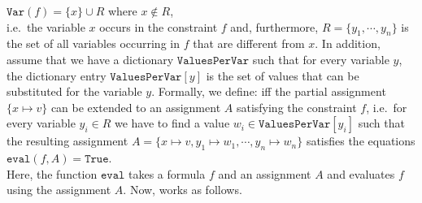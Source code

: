 $\texttt{Var}(f) = \{ x \} \cup R$ \quad where $x \not\in R$,
\\[0.2cm]
i.e.~the variable $x$ occurs in the constraint $f$ and, furthermore, $R = \{y_1, \cdots, y_n\}$ is the set of
all variables occurring 
in $f$ that are different from $x$.  In addition, assume that we have a dictionary $\texttt{ValuesPerVar}$ such that
for every variable $y$, the dictionary entry $\texttt{ValuesPerVar}[y]$ is the set of values that can be substituted
for the variable $y$.  Formally, we define: 
iff the partial assignment $\{ x \mapsto v \}$ can be extended to an assignment $A$ satisfying the constraint $f$,
i.e.~for every variable $y_i \in R$ we have to find a value $w_i \in \texttt{ValuesPerVar}[y_i]$ such that the resulting
assignment $A = \{ x \mapsto v, y_1 \mapsto w_1, \cdots, y_n \mapsto w_n \}$ satisfies the equations
\\[0.2cm]
\hspace*{1.3cm}
$\texttt{eval}(f, A) = \texttt{True}$.
\\[0.2cm]
Here, the function $\texttt{eval}$ takes a formula $f$ and an assignment $A$ and evaluates $f$ using the
assignment $A$.  Now,  works as follows. 
